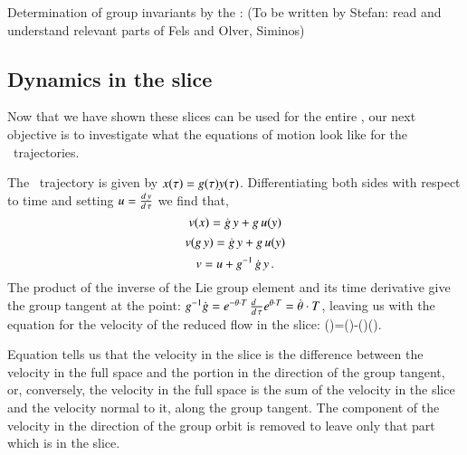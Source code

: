 
{Determination of group invariants by the {\mslices}:}{
(To be written by Stefan: read and understand relevant parts of Fels and
Olver, Siminos)
    }


\subsection{Dynamics in the slice}
\label{sect:MovFrameODE}

Now that we have shown these slices can be used for the entire
{\statesp}, our next objective is to investigate what the equations of
motion look like for the \reducedsp\ trajectories.

The \reducedsp\ trajectory is given by $x(\tau)=g(\tau)
y(\tau)$. Differentiating both sides with respect to time and
setting $u=\frac{d \, y}{d \, \tau}$ we find that,
\[
v(x)=\dot{g} \, y+g \, u(y) \]
\[
v(g \, y)=\dot{g} \, y+g \, u(y) \]
\[
v=u + g^{-1} \, \dot{g} \, y
\,.
\]
The product of the inverse of the Lie group element and its time derivative give the group tangent at the point:
$g^{-1}\dot{g}=e^{-{\bf \theta} \cdot T} \,
\frac{d ~~}{d \, \tau} e^{{\bf \theta} \cdot T}=\dot{{\bf \theta}}\cdot T$, leaving us with the equation for the velocity of the reduced flow in the slice:
\beq
\velRed(\sspRed)=\vel(\sspRed)-\dot{\gSpace}(\sspRed)\cdot \groupTan(\sspRed).

Equation  tells us that the velocity in the slice is the difference between the velocity in the full space and the portion in the direction of the group tangent, or, conversely, the velocity in the full space is the sum of the velocity in the slice and the velocity normal to it, along the group tangent. The component of the velocity in the direction of the group orbit is removed to leave only that part which is in the slice.

